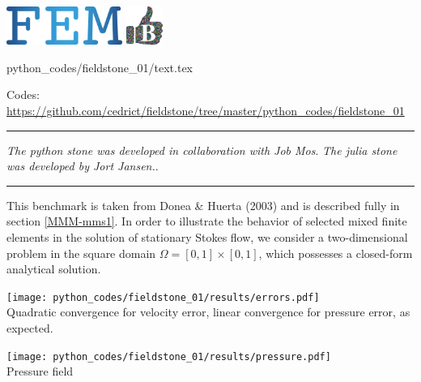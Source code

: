 \includegraphics[height=1.25cm]{images/pictograms/FEM}
\includegraphics[height=1.25cm]{images/pictograms/benchmark}

\begin{flushright} {\tiny {\color{gray} python\_codes/fieldstone\_01/text.tex}} \end{flushright}



\begin{center}
\inpython
\injulia
\infortran
{\small Codes: \url{https://github.com/cedrict/fieldstone/tree/master/python_codes/fieldstone_01}}
\end{center}

\par\noindent\rule{\textwidth}{0.4pt}

{\sl The python stone was developed in collaboration with Job Mos}. 
{\sl The julia stone was developed by Jort Jansen.}. 

\par\noindent\rule{\textwidth}{0.4pt}

This benchmark is taken from Donea \& Huerta (2003) \cite{dohu03} and is described fully in section \ref{MMM-mms1}. 
In order to illustrate the behavior of selected mixed finite elements in the solution 
of stationary Stokes flow,  we consider a two-dimensional problem 
in the square domain $\Omega=[0,1]\times[0,1]$, which possesses a closed-form analytical 
solution. 

\begin{center}
\texttt{[image: python\_codes/fieldstone\_01/results/errors.pdf]}\\
{\captionfont Quadratic convergence for velocity error, 
linear convergence for pressure error, as expected.}
\end{center}

\begin{center}
\texttt{[image: python\_codes/fieldstone\_01/results/pressure.pdf]}\\
{\captionfont Pressure field}
\end{center}

